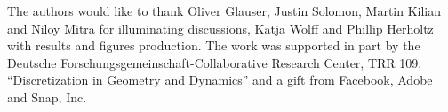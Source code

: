 \documentclass[acmtog]{acmart}
\begin{document}



\maketitle








\begin{acks}
The authors would like to thank Oliver Glauser, Justin Solomon, Martin Kilian and Niloy Mitra for illuminating discussions, Katja Wolff and Phillip Herholtz with results and figures production. The work was supported in part by the Deutsche Forschungsgemeinschaft-Collaborative Research Center, TRR 109, ``Discretization in Geometry and Dynamics'' and a gift from Facebook, Adobe and Snap, Inc.
\end{acks}




\appendix
\end{document}

